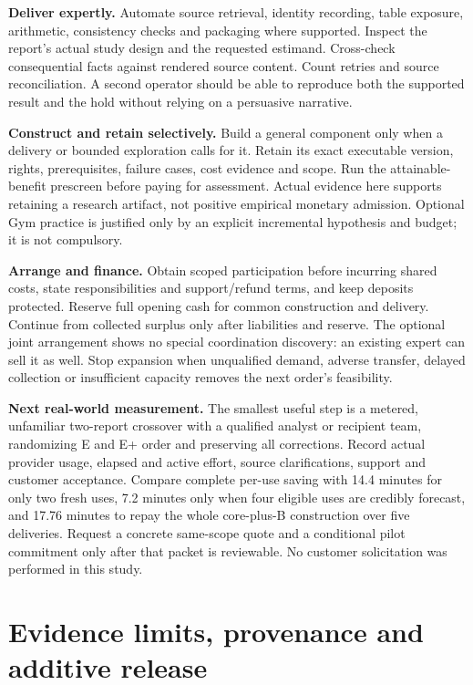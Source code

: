 \textbf{Deliver expertly.} Automate source retrieval, identity recording, table exposure, arithmetic, consistency checks and packaging where supported. Inspect the report's actual study design and the requested estimand. Cross-check consequential facts against rendered source content. Count retries and source reconciliation. A second operator should be able to reproduce both the supported result and the hold without relying on a persuasive narrative.

\textbf{Construct and retain selectively.} Build a general component only when a delivery or bounded exploration calls for it. Retain its exact executable version, rights, prerequisites, failure cases, cost evidence and scope. Run the attainable-benefit prescreen before paying for assessment. Actual evidence here supports retaining a research artifact, not positive empirical monetary admission. Optional Gym practice is justified only by an explicit incremental hypothesis and budget; it is not compulsory.

\textbf{Arrange and finance.} Obtain scoped participation before incurring shared costs, state responsibilities and support/refund terms, and keep deposits protected. Reserve full opening cash for common construction and delivery. Continue from collected surplus only after liabilities and reserve. The optional joint arrangement shows no special coordination discovery: an existing expert can sell it as well. Stop expansion when unqualified demand, adverse transfer, delayed collection or insufficient capacity removes the next order's feasibility.

\textbf{Next real-world measurement.} The smallest useful step is a metered, unfamiliar two-report crossover with a qualified analyst or recipient team, randomizing E and E+ order and preserving all corrections. Record actual provider usage, elapsed and active effort, source clarifications, support and customer acceptance. Compare complete per-use saving with 14.4 minutes for only two fresh uses, 7.2 minutes only when four eligible uses are credibly forecast, and 17.76 minutes to repay the whole core-plus-B construction over five deliveries. Request a concrete same-scope quote and a conditional pilot commitment only after that packet is reviewable. No customer solicitation was performed in this study.

\section{Evidence limits, provenance and additive release}

